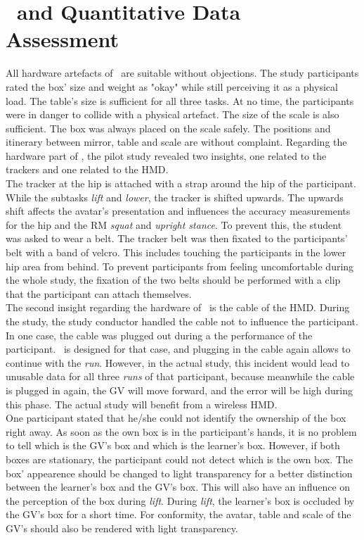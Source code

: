\section{\exgo\ and Quantitative Data Assessment}
\label{sec:evalSystem}
All hardware artefacts of \exgo\ are suitable without objections. The study participants rated the box' size and weight as "okay" while still perceiving it as a physical load. The table's size is sufficient for all three tasks. At no time, the participants were in danger to collide with a physical artefact. The size of the scale is also sufficient. The box was always placed on the scale safely. The positions and itinerary between mirror, table and scale are without complaint. Regarding the hardware part of \exgo, the pilot study revealed two insights, one related to the trackers and one related to the HMD.\\
The tracker at the hip is attached with a strap around the hip of the participant. While the subtasks \textit{lift} and \textit{lower}, the tracker is shifted upwards. The upwards shift affects the avatar's presentation and influences the accuracy measurements for the hip and the RM \textit{squat} and \textit{upright stance}. To prevent this, the student was asked to wear a belt. The tracker belt was then fixated to the participants' belt with a band of velcro. This includes touching the participants in the lower hip area from behind. To prevent participants from feeling uncomfortable during the whole study, the fixation of the two belts should be performed with a clip that the participant can attach themselves.\\
The second insight regarding the hardware of \exgo\ is the cable of the HMD. During the study, the study conductor handled the cable not to influence the participant. In one case, the cable was plugged out during a the performance of the participant. \exgo\ is designed for that case, and plugging in the cable again allows to continue with the \textit{run}. However, in the actual study, this incident would lead to unusable data for all three \textit{runs} of that participant, because meanwhile the cable is plugged in again, the GV will move forward, and the error will be high during this phase. The actual study will benefit from a wireless HMD.\\
One participant stated that he/she could not identify the ownership of the box right away. As soon as the own box is in the participant's hands, it is no problem to tell which is the GV's box and which is the learner's box. However, if both boxes are stationary, the participant could not detect which is the own box. The box' appearence should be changed to light transparency for a better distinction between the learner's box and the GV's box. This will also have an influence on the perception of the box during \textit{lift}. During \textit{lift}, the learner's box is occluded by the GV's box for a short time. For conformity, the avatar, table and scale of the GV's should also be rendered with light transparency.\\
